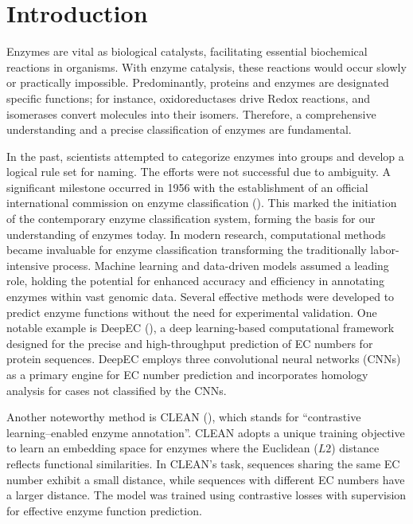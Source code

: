 \documentclass{bioinfo}
\begin{document}
\section{Introduction}

Enzymes are vital as biological catalysts, facilitating essential biochemical reactions in organisms.
With enzyme catalysis, these reactions would occur slowly or practically impossible.
Predominantly, proteins and enzymes are designated specific functions; for instance, oxidoreductases drive Redox reactions, and isomerases convert molecules into their isomers.
Therefore, a comprehensive understanding and a precise classification of enzymes are fundamental.

In the past, scientists attempted to categorize enzymes into groups and develop a logical rule set for naming.
The efforts were not successful due to ambiguity.
A significant milestone occurred in 1956 with the establishment of an official international commission on enzyme classification (\cite{International_Union_of_Biochemistry_and_Molecular_Biology_Nomenclature_Committee1993-ey}). 
This marked the initiation of the contemporary enzyme classification system, forming the basis for our understanding of enzymes today.
In modern research, computational methods became invaluable for enzyme classification transforming the traditionally labor-intensive process.
Machine learning and data-driven models assumed a leading role, holding the potential for enhanced 
accuracy and efficiency in annotating enzymes within vast genomic data.
Several effective methods were developed to predict enzyme functions without the need for experimental validation.
One notable example is DeepEC (\cite{DeepEC}), a deep learning-based computational framework designed for the precise and high-throughput prediction of EC numbers for protein sequences.
DeepEC employs three convolutional neural networks (CNNs) as a primary engine for EC number prediction and incorporates homology analysis for cases not classified by the CNNs.

Another noteworthy method is CLEAN (\cite{CleanArticle}), which stands for ``contrastive learning–enabled 
enzyme annotation''. CLEAN adopts a unique training objective to learn an embedding space for enzymes where the Euclidean ($L2$) distance 
reflects functional similarities. In CLEAN's task, sequences sharing the same EC number exhibit a small distance, while sequences 
with different EC numbers have a larger distance. The model was trained using contrastive losses with supervision for effective 
enzyme function prediction.
\end{document}
